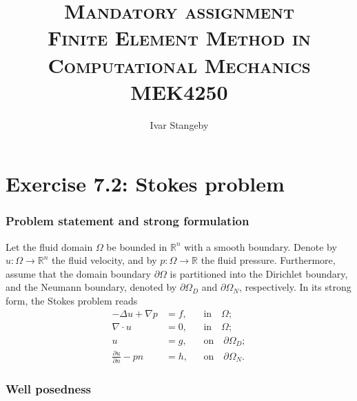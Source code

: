 \documentclass[twocolumn, article]{memoir}
\title{\textsc{Mandatory assignment \\ Finite Element Method in Computational
Mechanics \\ MEK4250}}
\author{Ivar Stangeby}
\begin{document}
\maketitle

\chapter*{Exercise 7.2: Stokes problem}

\subsection{Problem statement and strong formulation}    

Let the fluid domain \(\Omega\) be bounded in \(\mathbb{R}^n\) with a
smooth boundary. Denote by \( u \colon \Omega \to \mathbb{R} ^n \) the
fluid velocity, and by \( p \colon \Omega \to \mathbb{R} \) the fluid
pressure. Furthermore, assume that the domain boundary \( \partial\Omega \)
is partitioned into the Dirichlet boundary, and the Neumann boundary,
denoted by \( \partial\Omega_D \) and \( \partial\Omega_N \), respectively.
In its strong form, the Stokes problem reads
\begin{align*}
    -\Delta u + \nabla p &= f, & &\text{in}\quad \Omega;\\
    \nabla \cdot u &= 0, & &\text{in}\quad \Omega;\\
    u &= g, & &\text{on} \quad \partial \Omega_D;\\
    \frac{\partial u}{\partial n} - pn &= h,& &\text{on} \quad \partial\Omega_N.
\end{align*}

\subsection{Well posedness}
\label{sec:well_posedness}
\end{document}
